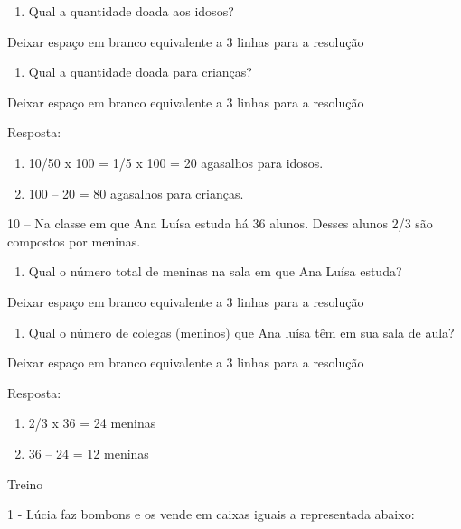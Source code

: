 \begin{enumerate}
\def\labelenumi{\alph{enumi})}
\item
  Qual a quantidade doada aos idosos?
\end{enumerate}

Deixar espaço em branco equivalente a 3 linhas para a resolução

\begin{enumerate}
\def\labelenumi{\alph{enumi})}
\item
  Qual a quantidade doada para crianças?
\end{enumerate}

Deixar espaço em branco equivalente a 3 linhas para a resolução

Resposta:

\begin{enumerate}
\def\labelenumi{\alph{enumi})}
\item
  10/50 x 100 = 1/5 x 100 = 20 agasalhos para idosos.
\item
  100 -- 20 = 80 agasalhos para crianças.
\end{enumerate}

10 -- Na classe em que Ana Luísa estuda há 36 alunos. Desses alunos 2/3
são compostos por meninas.

\begin{enumerate}
\def\labelenumi{\alph{enumi})}
\item
  Qual o número total de meninas na sala em que Ana Luísa estuda?
\end{enumerate}

Deixar espaço em branco equivalente a 3 linhas para a resolução

\begin{enumerate}
\def\labelenumi{\alph{enumi})}
\item
  Qual o número de colegas (meninos) que Ana luísa têm em sua sala de
  aula?
\end{enumerate}

Deixar espaço em branco equivalente a 3 linhas para a resolução

Resposta:

\begin{enumerate}
\def\labelenumi{\alph{enumi})}
\item
  2/3 x 36 = 24 meninas
\item
  36 -- 24 = 12 meninas
\end{enumerate}

Treino

1 - Lúcia faz bombons e os vende em caixas iguais a representada abaixo:

